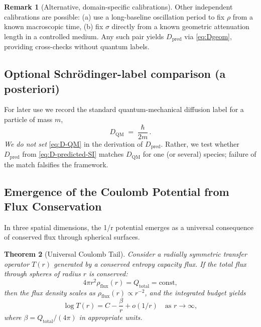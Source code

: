 \documentclass[11pt]{article}
\theoremstyle{plain}
\newtheorem{theorem}{Theorem}[section]
\theoremstyle{definition}
\newtheorem{remark}[theorem]{Remark}
\begin{document}
\begin{remark}[Alternative, domain-specific calibrations]
  Other independent calibrations are possible: (a) use a long-baseline oscillation period to fix $\rho$ from a known macroscopic time,
  (b) fix $\sigma$ directly from a known geometric attenuation length in a controlled medium.  Any such pair yields $D_{\mathrm{pred}}$
  via \eqref{eq:Dgeom}, providing cross-checks without quantum labels.
\end{remark}

\subsection{Optional Schr\"odinger-label comparison (a posteriori)}\label{subsec:QM-label-check}

For later use we record the standard quantum-mechanical diffusion label for a particle of mass $m$,
\begin{equation}\label{eq:D-QM}
  D_{\mathrm{QM}} \;=\; \frac{\hbar}{2m}\, .
\end{equation}
\emph{We do not set} \eqref{eq:D-QM} in the derivation of $D_{\mathrm{pred}}$.
Rather, we test whether $D_{\mathrm{pred}}$ from \eqref{eq:D-predicted-SI} matches $D_{\mathrm{QM}}$
for one (or several) species; failure of the match falsifies the framework.

\subsection{Emergence of the Coulomb Potential from Flux Conservation}

In three spatial dimensions, the 1/r potential emerges as a universal consequence of
conserved flux through spherical surfaces.

\begin{theorem}[Universal Coulomb Tail]
  Consider a radially symmetric transfer operator $T(r)$ generated by a conserved
  entropy capacity flux. If the total flux through spheres of radius $r$ is conserved:
  \[
    4\pi r^2 \rho_{\text{flux}}(r) = Q_{\text{total}} = \text{const},
  \]
  then the flux density scales as $\rho_{\text{flux}}(r) \propto r^{-2}$, and the
  integrated budget yields
  \[
    \log T(r) = C - \frac{\beta}{r} + o(1/r) \quad \text{as } r \to \infty,
  \]
  where $\beta = Q_{\text{total}}/(4\pi)$ in appropriate units.
\end{theorem}
\end{document}
